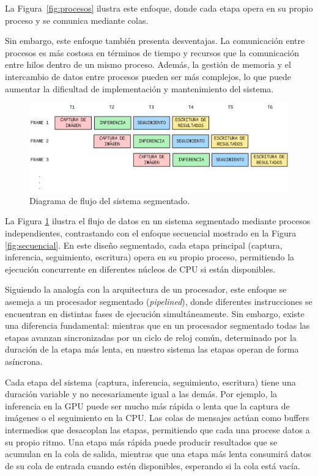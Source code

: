 \documentclass[11pt,spanish,listoffigures,listoftables]{tfgetsinf}
\begin{document}
La Figura~\ref{fig:procesos} ilustra este enfoque, donde cada etapa opera en su propio proceso y se comunica mediante colas.

Sin embargo, este enfoque también presenta desventajas. La comunicación entre procesos es más costosa en términos de tiempo y recursos que la comunicación entre hilos dentro de un mismo proceso. Además, la gestión de memoria y el intercambio de datos entre procesos pueden ser más complejos, lo que puede aumentar la dificultad de implementación y mantenimiento del sistema.

\begin{figure}[H]
   \centering
   \includegraphics[width=1\textwidth]{images/diseno_e_implementacion/segmentacion.png}
   \caption[Diagrama de flujo del sistema segmentado]{Diagrama de flujo del sistema segmentado.}
   \label{fig:segmentacion}
\end{figure}

La Figura \ref{fig:segmentacion} ilustra el flujo de datos en un sistema segmentado mediante procesos independientes, contrastando con el enfoque secuencial mostrado en la Figura \ref{fig:secuencial}. En este diseño segmentado, cada etapa principal (captura, inferencia, seguimiento, escritura) opera en su propio proceso, permitiendo la ejecución concurrente en diferentes núcleos de CPU si están disponibles.

Siguiendo la analogía con la arquitectura de un procesador, este enfoque se asemeja a un procesador segmentado (\textit{pipelined}), donde diferentes instrucciones se encuentran en distintas fases de ejecución simultáneamente. Sin embargo, existe una diferencia fundamental: mientras que en un procesador segmentado todas las etapas avanzan sincronizadas por un ciclo de reloj común, determinado por la duración de la etapa más lenta, en nuestro sistema las etapas operan de forma asíncrona.

Cada etapa del sistema (captura, inferencia, seguimiento, escritura) tiene una duración variable y no necesariamente igual a las demás. Por ejemplo, la inferencia en la GPU puede ser mucho más rápida o lenta que la captura de imágenes o el seguimiento en la CPU. Las colas de mensajes actúan como buffers intermedios que desacoplan las etapas, permitiendo que cada una procese datos a su propio ritmo. Una etapa más rápida puede producir resultados que se acumulan en la cola de salida, mientras que una etapa más lenta consumirá datos de su cola de entrada cuando estén disponibles, esperando si la cola está vacía.
\end{document}
